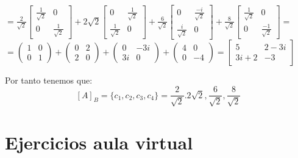 \documentclass{report}
\begin{document}
\begin{enumerate}
\begin{enumerate}[label=\alph*)]
    $=\frac{2}{\sqrt{2}}\left[\begin{array}{cc}
    \frac{1}{\sqrt{2}} & 0 \\
    0 & \frac{1}{\sqrt{2}}
    \end{array}\right]+2 \sqrt{2}\left[\begin{array}{cc}
    0 & \frac{1}{\sqrt{2}} \\
    \frac{1}{\sqrt{2}} & 0
    \end{array}\right]+\frac{6}{\sqrt{2}}\left[\begin{array}{cc}
    0 & \frac{-i}{\sqrt{2}} \\
    \frac{i}{\sqrt{2}} & 0
    \end{array}\right]+\frac{8}{\sqrt{2}}\left[\begin{array}{cc}
    \frac{1}{\sqrt{2}} & 0 \\
    0 & \frac{-1}{\sqrt{2}}
    \end{array}\right]=$\\
    $=\begin{pmatrix}
        1 &0\\
        0 & 1
    \end{pmatrix}+\begin{pmatrix}
        0 &2 \\
        2 & 0
    \end{pmatrix}+\begin{pmatrix}
        0 & -3i\\
        3i & 0
    \end{pmatrix}+\begin{pmatrix}
        4 & 0\\
        0 & -4
    \end{pmatrix}=\left[\begin{matrix}5 & 2 - 3 i\\3 i + 2 & -3\end{matrix}\right]$
    
    
    Por tanto tenemos que: $$[A]_B=\{c_1,c_2,c_3,c_4\}=\frac{2}{\sqrt{2}}.2\sqrt{2},\frac{6}{\sqrt{2}},\frac{8}{\sqrt{2}}$$
    \end{enumerate}
    
    \newpage 
    \section*{Ejercicios aula virtual}
    

\end{enumerate}
\end{document}

